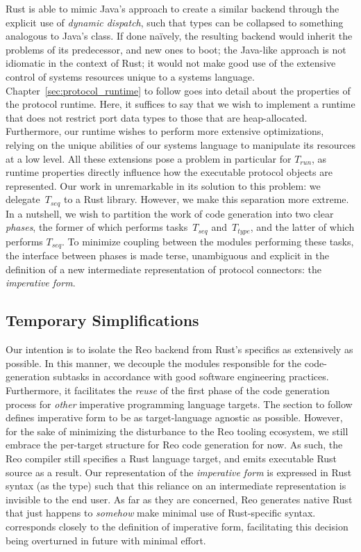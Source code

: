 Rust is able to mimic Java's approach to create a similar backend through the explicit use of \textit{dynamic dispatch}, such that types can be collapsed to something analogous to Java's  class. If done na\"ively, the resulting backend would inherit the problems of its predecessor, and new ones to boot; the Java-like approach is not idiomatic in the context of Rust; it would not make good use of the extensive control of systems resources unique to a systems language. Chapter~\ref{sec:protocol_runtime} to follow goes into detail about the properties of the protocol runtime. Here, it suffices to say that we wish to implement a runtime that does not restrict port data types to those that are heap-allocated. Furthermore, our runtime wishes to perform more extensive optimizations, relying on the unique abilities of our systems language to manipulate its resources at a low level. All these extensions pose a problem in particular for $T_{run}$, as runtime properties directly influence how the executable protocol objects are represented. Our work in unremarkable in its solution to this problem: we delegate~$T_{seq}$ to a Rust library. However, we make this separation more extreme. In a nutshell, we wish to partition the work of code generation into two clear \textit{phases}, the former of which performs tasks~$T_{seq}$ and~$T_{type}$, and the latter of which performs $T_{seq}$. To minimize coupling between the modules performing these tasks, the interface between phases is made terse, unambiguous and explicit in the definition of a new intermediate representation of protocol connectors: the \textit{imperative form}.

\subsection{Temporary Simplifications}
\label{sec:temporary_simplifications}
Our intention is to isolate the Reo backend from Rust's specifics as extensively as possible. In this manner, we decouple the modules responsible for the code-generation subtasks in accordance with good software engineering practices. Furthermore, it facilitates the \textit{reuse} of the first phase of the code generation process for \textit{other} imperative programming language targets. The section to follow defines imperative form to be as target-language agnostic as possible. However, for the sake of minimizing the disturbance to the Reo tooling ecosystem, we still embrace the per-target structure for Reo code generation for now. As such, the Reo compiler still specifies a Rust language target, and emits executable Rust source as a result. Our representation of the \textit{imperative form} is expressed in Rust syntax (as the  type) such that this reliance on an intermediate representation is invisible to the end user. As far as they are concerned, Reo generates native Rust that just happens to \textit{somehow} make minimal use of Rust-specific syntax.  corresponds closely to the definition of imperative form, facilitating this decision being overturned in future with minimal effort.


